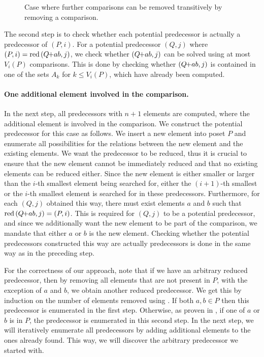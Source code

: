 \documentclass[twoside,leqno,twocolumn]{article}
\newcommand{\pchild}[3]{{#1}\kern-1pt{+}{#2}{#3}}
\newcommand{\reduced}[1]{\operatorname{red}{#1}}
\begin{document}
\begin{figure}[!b]
  \centering
  
  \caption{Case where further comparisons can be removed transitively by removing a comparison.}
  \label{fig:backward_problematic}
\end{figure}

The second step is to check whether each potential predecessor is actually a predecessor of $(P, i)$.
For a potential predecessor $(Q, j)$ where $(P, i) = \reduced{(\pchild{Q}{a}{b}, j)}$, we check whether $(\pchild{Q}{a}{b}, j)$ can be solved using at most $V_i(P)$ comparisons.
This is done by checking whether $(\pchild{Q}{a}{b}, j)$ is contained in one of the sets $A_k$ for $k \leq V_i(P)$, which have already been computed.


\paragraph{One additional element involved in the comparison.}
In the next step, all predecessors with $n + 1$ elements are computed, where the additional element is involved in the comparison.
We construct the potential predecessor for this case as follows.
We insert a new element into poset $P$ and enumerate all possibilities for the relations between the new element and the existing elements.
We want the predecessor to be reduced, thus it is crucial to ensure that the new element cannot be immediately reduced and that no existing elements can be reduced either.
Since the new element is either smaller or larger than the $i$-th smallest element being searched for, either the $(i + 1)$-th smallest or the $i$-th smallest element is searched for in these predecessors.
Furthermore, for each $(Q, j)$ obtained this way, there must exist elements $a$ and $b$ such that $\reduced{(\pchild{Q}{a}{b}, j)} = (P, i)$.
This is required for $(Q, j)$ to be a potential predecessor, and since we additionally want the new element to be part of the comparison, we mandate that either $a$ or $b$ is the new element.
Checking whether the potential predecessors constructed this way are actually predecessors is done in the same way as in the preceding step.

For the correctness of our approach, note that if we have an arbitrary reduced predecessor, then by removing all elements that are not present in $P$, with the exception of $a$ and $b$, we obtain another reduced predecessor.
We get this by induction on the number of elements removed using .
If both $a, b \in P$ then this predecessor is enumerated in the first step.
Otherwise, as proven in , if one of $a$ or $b$ is in $P$, the predecessor is enumerated in this second step.
In the next step, we will iteratively enumerate all predecessors by adding additional elements to the ones already found.
This way, we will discover the arbitrary predecessor we started with.
\end{document}
